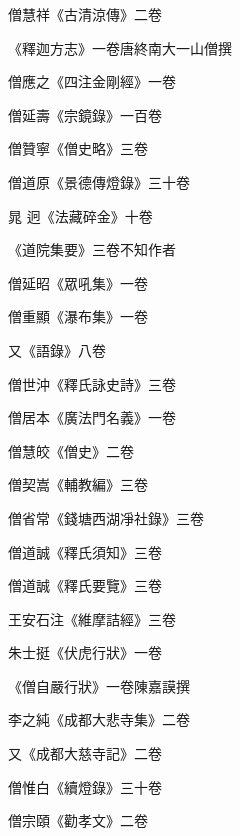 \begin{pinyinscope}
 僧慧祥《古清涼傳》二卷



 《釋迦方志》一卷唐終南大一山僧撰



 僧應之《四注金剛經》一卷



 僧延壽《宗鏡錄》一百卷



 僧贊寧《僧史略》三卷



 僧道原《景德傳燈錄》三十卷



 晁
 迥《法藏碎金》十卷



 《道院集要》三卷不知作者



 僧延昭《眾吼集》一卷



 僧重顯《瀑布集》一卷



 又《語錄》八卷



 僧世沖《釋氏詠史詩》三卷



 僧居本《廣法門名義》一卷



 僧慧皎《僧史》二卷



 僧契嵩《輔教編》三卷



 僧省常《錢塘西湖凈社錄》三卷



 僧道誠《釋氏須知》三卷



 僧道誠《釋氏要覽》三卷



 王安石注《維摩詰經》三卷



 朱士挺《伏虎行狀》一卷



 《僧自嚴行狀》一卷陳嘉謨撰



 李之純《成都大悲寺集》二卷



 又《成都大慈寺記》二卷



 僧惟白《續燈錄》三十卷



 僧宗頤《勸孝文》二卷




\end{pinyinscope}
